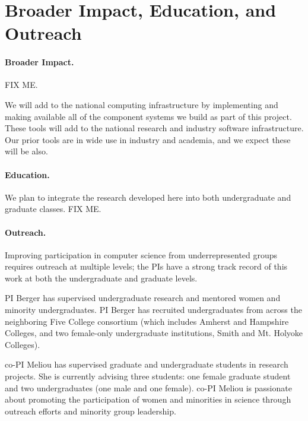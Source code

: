 \section{Broader Impact, Education, and Outreach}
\label{sec:impact}

\paragraph{Broader Impact.} 
FIX ME.

We will add to the national computing infrastructure by implementing
and making available all of the component
systems we build as part of this project.  These tools will add to the national research and industry
software infrastructure. Our prior tools are in wide use in industry
and academia, and we expect these will be also.

\paragraph{Education.}
We plan to integrate the research developed here into both
undergraduate and graduate classes. FIX ME.

\paragraph{Outreach.}
Improving participation in computer science from underrepresented groups
requires outreach at multiple levels; the PIs have a strong track record
of this work at both the undergraduate and graduate levels.

PI Berger has supervised undergraduate research and
mentored women and minority undergraduates. PI Berger has recruited undergraduates from
across the neighboring Five College consortium (which includes Amherst
and Hampshire Colleges, and two female-only undergraduate institutions,
Smith and Mt. Holyoke Colleges).

co-PI Meliou has supervised graduate and undergraduate students in research projects. She is currently advising three students: one female graduate student and two undergraduates (one male and one female). co-PI Meliou is passionate about promoting the participation of women and minorities in science through outreach efforts and minority group leadership.

